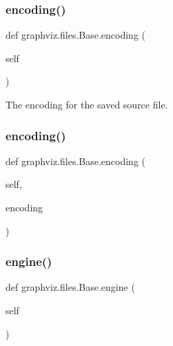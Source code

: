 \subsubsection{\texorpdfstring{encoding()}{encoding()}\hspace{0.1cm}{\footnotesize\ttfamily [1/2]}}
{\footnotesize\ttfamily def graphviz.\+files.\+Base.\+encoding (\begin{DoxyParamCaption}\item[{}]{self }\end{DoxyParamCaption})}

\begin{DoxyVerb}The encoding for the saved source file.\end{DoxyVerb}
 \mbox{\label{classgraphviz_1_1files_1_1Base_a21aaf8c3e477920671638b67302a3449}} 
\subsubsection{\texorpdfstring{encoding()}{encoding()}\hspace{0.1cm}{\footnotesize\ttfamily [2/2]}}
{\footnotesize\ttfamily def graphviz.\+files.\+Base.\+encoding (\begin{DoxyParamCaption}\item[{}]{self,  }\item[{}]{encoding }\end{DoxyParamCaption})}

\mbox{\label{classgraphviz_1_1files_1_1Base_a57460801144f9d27cca7c3e31067dbca}} 
\subsubsection{\texorpdfstring{engine()}{engine()}\hspace{0.1cm}{\footnotesize\ttfamily [1/2]}}
{\footnotesize\ttfamily def graphviz.\+files.\+Base.\+engine (\begin{DoxyParamCaption}\item[{}]{self }\end{DoxyParamCaption})}

